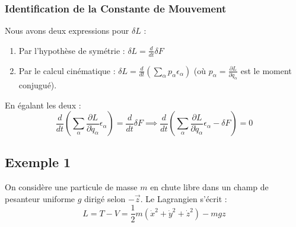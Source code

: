 \documentclass[french]{yLectureNote}
\renewcommand{\vec}{\overrightarrow}
\newcommand{\dd}{\mathrm{d}}
\begin{document}
\subsubsection{Identification de la Constante de Mouvement}
Nous avons deux expressions pour $\delta L$ :
\begin{enumerate}
    \item Par l'hypothèse de symétrie : $\delta L = \frac{d}{dt} \delta F$
    \item Par le calcul cinématique : $\delta L = \frac{d}{dt} \left( \sum_\alpha p_\alpha \epsilon_\alpha \right)$ (où $p_\alpha = \frac{\partial L}{\partial \dot{q}_\alpha}$ est le moment conjugué).
\end{enumerate}

En égalant les deux :
$$\frac{d}{dt} \left( \sum_\alpha \frac{\partial L}{\partial \dot{q}_\alpha} \epsilon_\alpha \right) = \frac{d}{dt} \delta F \implies \frac{d}{dt} \left( \sum_\alpha \frac{\partial L}{\partial \dot{q}_\alpha} \epsilon_\alpha - \delta F \right) = 0$$




\subsection{Exemple 1}








On considère une particule de masse $m$ en chute libre dans un champ de pesanteur uniforme $g$ dirigé selon $-\vec{z}$. Le Lagrangien s'écrit :
$$L = T - V = \frac{1}{2}m(\dot{x}^2 + \dot{y}^2 + \dot{z}^2) - mgz$$
\end{document}

